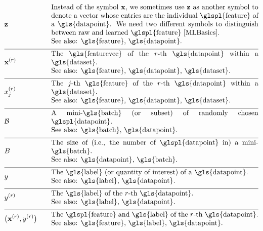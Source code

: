 \begin{align}
	&\rawfeaturevec &\quad &\parbox{.85\textwidth}{Instead of the symbol $\featurevec$, we 
		sometimes use $\rawfeaturevec$ as another symbol to denote a vector whose entries 
		are the individual \glspl{feature} of a \gls{datapoint}. We need two 
		different symbols to distinguish between raw and learned \glspl{feature} \cite[Ch. 9]{MLBasics}.
		\\ See also: \gls{feature}, \gls{datapoint}. }\nonumber \\[2mm] \hline \nonumber\\[-5mm]
	&\featurevec^{(\sampleidx)} &\quad &\parbox{.85\textwidth}{The \gls{featurevec} of the $\sampleidx$-th \gls{datapoint} within a \gls{dataset}.
		\\ See also: \gls{feature}, \gls{datapoint}, \gls{dataset}. } \nonumber \\[2mm] \hline \nonumber\\[-5mm]
	&\feature_{\featureidx}^{(\sampleidx)} &\quad &\parbox{.85\textwidth}{The $\featureidx$-th \gls{feature} of the $\sampleidx$-th 
		\gls{datapoint} within a \gls{dataset}.
		\\ See also: \gls{feature}, \gls{datapoint}, \gls{dataset}.} \nonumber \\[2mm] \hline \nonumber\\[-5mm]
	&\batch &\quad &\parbox{.85\textwidth}{A mini-\gls{batch} (or subset) of randomly chosen \glspl{datapoint}.
		\\ See also: \gls{batch}, \gls{datapoint}. }\nonumber \\[2mm] \hline \nonumber\\[-5mm]
	&\batchsize &\quad &\parbox{.85\textwidth}{The size of (i.e., the number of \glspl{datapoint} in) a mini-\gls{batch}.
		\\ See also: \gls{datapoint}, \gls{batch}. }\nonumber \\[2mm] \hline \nonumber\\[-5mm]
	&\truelabel &\quad &\parbox{.85\textwidth}{The \gls{label} (or quantity of interest) of a \gls{datapoint}.
		\\ See also: \gls{label}, \gls{datapoint}. } \nonumber \\[2mm] \hline \nonumber\\[-5mm]
	&\truelabel^{(\sampleidx)} &\quad &\parbox{.85\textwidth}{The \gls{label} of the $\sampleidx$-th \gls{datapoint}.
		\\ See also: \gls{label}, \gls{datapoint}. } \nonumber \\[2mm] \hline \nonumber\\[-5mm]
	&\big(\featurevec^{(\sampleidx)},\truelabel^{(\sampleidx)}\big) &\quad &\parbox{.85\textwidth}{The \glspl{feature} and \gls{label} of the $\sampleidx$-th \gls{datapoint}.
		\\ See also: \gls{feature}, \gls{label}, \gls{datapoint}. }\nonumber 
\end{align}                  


